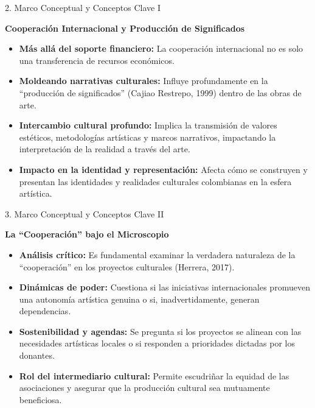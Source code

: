 \documentclass[aspectratio=169]{beamer}
\begin{document}
\begin{frame}[fragile]{2. Marco Conceptual y Conceptos Clave I}


\textbf{Cooperación Internacional y Producción de Significados}

\begin{itemize}
  \item \textbf{Más allá del soporte financiero:} La cooperación internacional no es solo una transferencia de recursos económicos.
  \item \textbf{Moldeando narrativas culturales:} Influye profundamente en la ``producción de significados'' (Cajiao Restrepo, 1999) dentro de las obras de arte.
  \item \textbf{Intercambio cultural profundo:} Implica la transmisión de valores estéticos, metodologías artísticas y marcos narrativos, impactando la interpretación de la realidad a través del arte.
  \item \textbf{Impacto en la identidad y representación:} Afecta cómo se construyen y presentan las identidades y realidades culturales colombianas en la esfera artística.
\end{itemize}
\end{frame}



\begin{frame}[fragile]{3. Marco Conceptual y Conceptos Clave II}


\textbf{La ``Cooperación'' bajo el Microscopio}

\begin{itemize}
  \item \textbf{Análisis crítico:} Es fundamental examinar la verdadera naturaleza de la ``cooperación'' en los proyectos culturales (Herrera, 2017).
  \item \textbf{Dinámicas de poder:} Cuestiona si las iniciativas internacionales promueven una autonomía artística genuina o si, inadvertidamente, generan dependencias.
  \item \textbf{Sostenibilidad y agendas:} Se pregunta si los proyectos se alinean con las necesidades artísticas locales o si responden a prioridades dictadas por los donantes.
  \item \textbf{Rol del intermediario cultural:} Permite escudriñar la equidad de las asociaciones y asegurar que la producción cultural sea mutuamente beneficiosa.
\end{itemize}
\end{frame}
\end{document}
